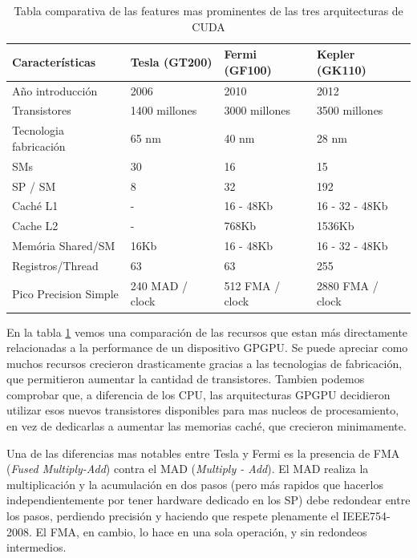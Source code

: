 \begin{table}[h]
  \begin{tabular}{@{}llll@{}}
    \toprule
    Caracter\'isticas        & Tesla (GT200)   & Fermi (GF100)   & Kepler (GK110)   \\ \midrule
    A\~no introducci\'on     & 2006            & 2010            & 2012             \\
    Transistores             & 1400 millones   & 3000 millones   & 3500 millones    \\
    Tecnologia fabricaci\'on & 65 nm           & 40 nm           & 28 nm            \\
    SMs                      & 30              & 16              & 15               \\
    SP / SM                  & 8               & 32              & 192              \\
    Cach\'e L1               & -               & 16 - 48Kb       & 16 - 32 - 48Kb   \\
    Cache L2                 & -               & 768Kb           & 1536Kb           \\
    Mem\'oria Shared/SM      & 16Kb            & 16 - 48Kb       & 16 - 32 - 48Kb   \\
    Registros/Thread         & 63              & 63              & 255              \\
    Pico Precision Simple    & 240 MAD / clock & 512 FMA / clock & 2880 FMA / clock \\ \bottomrule
  \end{tabular}
\caption{Tabla comparativa de las features mas prominentes de las tres arquitecturas de CUDA}
\label{tab:CudaGenerations}
\end{table}

En la tabla \ref{tab:CudaGenerations} vemos una comparaci\'on de las recursos que estan m\'as directamente
relacionadas a la performance de un dispositivo GPGPU. Se puede apreciar como muchos recursos
crecieron drasticamente gracias a las tecnologias de fabricaci\'on, que permitieron aumentar la
cantidad de transistores. Tambien podemos comprobar que, a diferencia de los CPU, las arquitecturas GPGPU
decidieron utilizar esos nuevos transistores disponibles para mas nucleos de procesamiento, en vez
de dedicarlas a aumentar las memorias cach\'e, que crecieron minimamente.

Una de las diferencias mas notables entre Tesla y Fermi es la presencia de FMA (\textit{Fused Multiply-Add})
contra el MAD (\textit{Multiply - Add}). El MAD realiza la multiplicaci\'on y la acumulaci\'on
en dos pasos (pero m\'as rapidos que hacerlos independientemente por tener hardware dedicado en los SP)
debe redondear entre los pasos, perdiendo precisi\'on y haciendo que respete plenamente el IEEE754-2008. El FMA,
en cambio, lo hace en una sola operaci\'on, y sin redondeos intermedios.

